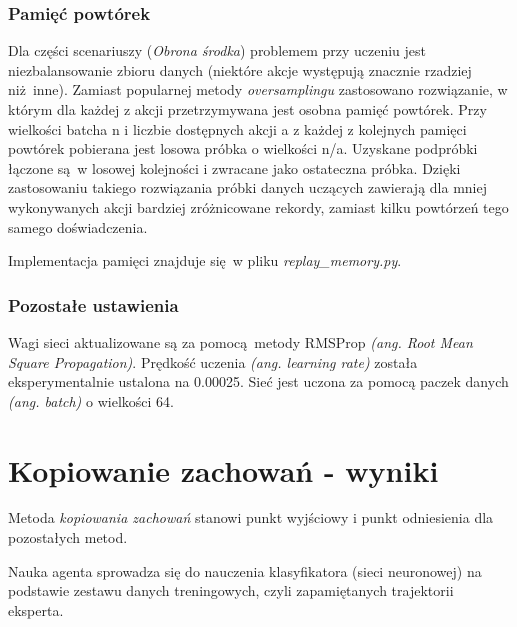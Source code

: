 \documentclass[polish,master,a4paper,oneside]{ppfcmthesis}
\begin{document}
\subsubsection{Pamięć powtórek}
Dla części scenariuszy (\textit{Obrona środka}) problemem przy uczeniu jest niezbalansowanie zbioru danych (niektóre akcje występują znacznie rzadziej niż inne). Zamiast popularnej metody \textit{oversamplingu} zastosowano rozwiązanie, w którym dla każdej z akcji przetrzymywana jest osobna pamięć powtórek. Przy wielkości batcha n i liczbie dostępnych akcji a z każdej z kolejnych pamięci powtórek pobierana jest losowa próbka o wielkości n/a. Uzyskane podpróbki łączone są w losowej kolejności i zwracane jako ostateczna próbka. Dzięki zastosowaniu takiego rozwiązania próbki danych uczących zawierają dla mniej wykonywanych akcji bardziej zróżnicowane rekordy, zamiast kilku powtórzeń tego samego doświadczenia.

Implementacja pamięci znajduje się w pliku \textit{replay\_memory.py}.

\subsubsection{Pozostałe ustawienia}

Wagi sieci aktualizowane są za pomocą metody RMSProp \textit{(ang. Root Mean Square Propagation)}. Prędkość uczenia \textit{(ang. learning rate)} została eksperymentalnie ustalona na 0.00025. Sieć jest uczona za pomocą paczek danych \textit{(ang. batch)} o wielkości 64.










 \section{Kopiowanie zachowań - wyniki}\label{bc_results}
Metoda \textit{kopiowania zachowań} stanowi punkt wyjściowy i punkt odniesienia dla pozostałych metod.

Nauka agenta sprowadza się do nauczenia klasyfikatora (sieci neuronowej) na podstawie zestawu danych treningowych, czyli zapamiętanych trajektorii eksperta.
\end{document}
